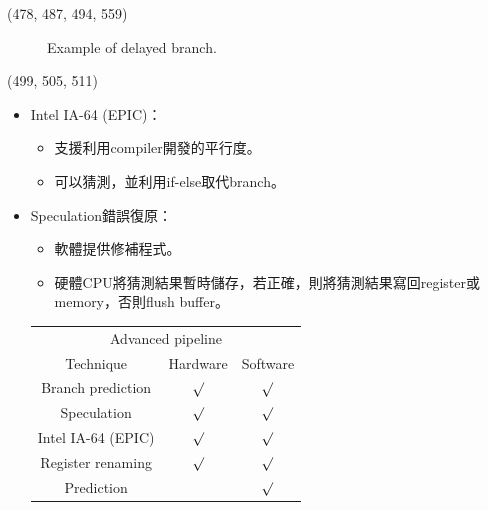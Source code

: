 \begin{theorem}{(478, 487, 494, 559)}
\begin{itemize}
\begin{itemize}
\begin{figure}[H]
                \caption{Example of delayed branch.}
                \label{img:delayed-branch}
            \end{figure}
        \end{itemize}
    \end{itemize}
\end{theorem}

\item \begin{theorem}{(499, 505, 511)} \quad\quad \begin{itemize}
        \item Intel IA-64 (EPIC)：\begin{itemize}
            \item 支援利用compiler開發的平行度。
            \item 可以猜測，並利用if-else取代branch。
        \end{itemize}
        \item Speculation錯誤復原：\begin{itemize}
            \item 軟體提供修補程式。
            \item 硬體CPU將猜測結果暫時儲存，若正確，則將猜測結果寫回register或memory，否則flush buffer。
        \end{itemize}
        \begin{table}[H]
            \centering
            \begin{tabular}{|c|c|c|}
                \hline
                \multicolumn{3}{|c|}{Advanced pipeline} \\
                \Xhline{3\arrayrulewidth}
                Technique & Hardware & Software \\
                \Xhline{2\arrayrulewidth}
                Branch prediction & $\surd$ & $\surd$ \\
                \hline
                Speculation & $\surd$ & $\surd$ \\
                \hline
                Intel IA-64 (EPIC) & $\surd$ & $\surd$ \\
                \hline
                Register renaming & $\surd$ & $\surd$ \\
                \hline
                Prediction & & $\surd$ \\
                \hline
            \end{tabular}
        \end{table}
    \end{itemize}
\end{theorem}

